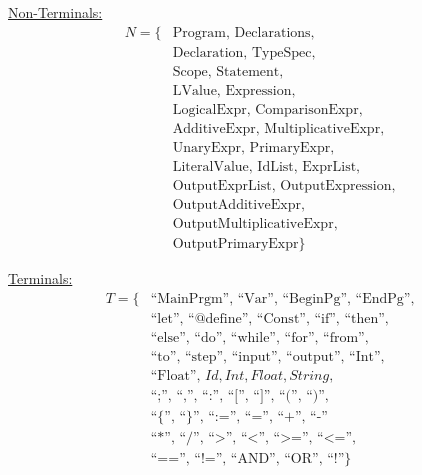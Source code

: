 \documentclass[12pt,a4paper]{article}
\begin{document}
    \begin{minipage}[t]{0.48\textwidth}
    \underline{Non-Terminals:}
    \begin{align*}
    N = \{ & \text{Program, Declarations,} \\
           & \text{Declaration, TypeSpec,} \\
           & \text{Scope, Statement,} \\
           & \text{LValue, Expression,} \\
           & \text{LogicalExpr, ComparisonExpr,} \\
           & \text{AdditiveExpr, MultiplicativeExpr,} \\
           & \text{UnaryExpr, PrimaryExpr,} \\
           & \text{LiteralValue, IdList, ExprList,} \\
           & \text{OutputExprList, OutputExpression,} \\
           & \text{OutputAdditiveExpr,} \\
           & \text{OutputMultiplicativeExpr,} \\
           & \text{OutputPrimaryExpr} \}
    \end{align*}
    \end{minipage}
    \hfill
    \begin{minipage}[t]{0.48\textwidth}
    \underline{Terminals:}
    \begin{align*}
    T = \{ & \text{``MainPrgm'', ``Var'', ``BeginPg'', ``EndPg'',} \\
           & \text{``let'', ``@define'', ``Const'', ``if'', ``then'',} \\
           & \text{``else'', ``do'', ``while'', ``for'', ``from'',} \\
           & \text{``to'', ``step'', ``input'', ``output'', ``Int'',} \\
           & \text{``Float'', } \mathit{Id}, \mathit{Int}, \mathit{Float}, \mathit{String}, \\
           & \text{``;'', ``,'', ``:'', ``['', ``]'', ``('', ``)'',} \\
           & \text{``\{'', ``\}'', ``:='', ``='', ``+'', ``-''} \\
           & \text{``*'', ``/'', ``>'', ``<'', ``>='', ``<='',} \\
           & \text{``=='', ``!='', ``AND'', ``OR'', ``!''} \}
    \end{align*}
    \end{minipage}
    
\end{document}
